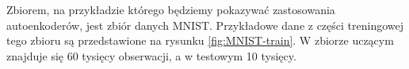 \documentclass[12pt]{mwbk}
\theoremstyle{plain}
\theoremstyle{definition}
\theoremstyle{remark}
\newcommand\zrodlo[1]{\par\vspace{-3mm}{\small\textit{Źródło: }#1 }}
\begin{document}













Zbiorem, na przykładzie którego będziemy pokazywać zastosowania autoenkoderów, jest zbiór danych MNIST. Przykładowe dane z części treningowej tego zbioru są przedstawione na rysunku \ref{fig:MNIST-train}. W zbiorze uczącym znajduje się 60 tysięcy obserwacji, a w testowym 10 tysięcy.
\end{document}
